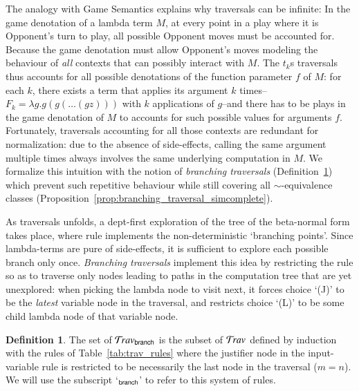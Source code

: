 \documentclass{elsarticle}
\theoremstyle{plain}
\theoremstyle{definition}
\newtheorem{definition}{Definition}[section]
\theoremstyle{remark}
\newcommand\Nodes{\mathcal{N}}%
\newcommand\NodesVar{\Nodes_{\sf var}}%
\newcommand{\branching}{{\sf branch}}
\newcommand{\travsetbr}{{\travset_\branching}}
\newcommand{\travulc}{\travset}
\newcommand{\rulefont}[1]{\mathbf{\sf #1}}
\newcommand{\enables}{\vdash} %
\newcommand{\ExtNodes}{\Nodes^{\sf ext}}
\begin{document}
The analogy with Game Semantics explains why traversals can be infinite: In the game denotation of a lambda term $M$, at every point in a play where it is Opponent's turn to play, all possible Opponent moves must be accounted for. Because the game denotation must allow Opponent's moves modeling the behaviour of \emph{all} contexts that can possibly interact with $M$. The $t_k$s traversals thus accounts for all possible denotations of the function parameter $f$ of $M$: for each $k$, there exists a term that applies its argument $k$ times--$F_k = \lambda g . g (g ( \ldots (g z)))$ with $k$ applications of $g$--and there has to be plays in the game denotation of $M$ to accounts for such possible values for arguments $f$. Fortunately, traversals accounting for all those contexts are redundant for normalization: due to the absence of side-effects, calling the same argument multiple times always involves the same underlying computation in $M$. We formalize this intuition with the notion of \emph{branching traversals} (Definition~\ref{dfn:branching_traversals})  which prevent such repetitive behaviour while still covering all $\sim$-equivalence classes (Proposition~\ref{prop:branching_traversal_simcomplete}).

As traversals unfolds, a dept-first exploration of the tree of the beta-normal form takes place, where rule  implements the non-deterministic `branching points'. Since lambda-terms are pure of side-effects,
it is sufficient to explore each possible branch only once.
\emph{Branching traversals} implement this idea by restricting the rule  so as to traverse only nodes leading to paths in the computation tree that are yet unexplored: when picking the lambda node to visit next, it forces choice `(J)' to be the \emph{latest} variable node in the traversal, and restricts choice `(L)' to be some child lambda node of that variable node.

\begin{definition}
\label{dfn:branching_traversals}
The set of  $\travsetbr$ is the subset of $\travulc$ defined by induction with the rules of Table~\ref{tab:trav_rules} where the justifier node in the
input-variable rule  is restricted to be necessarily the last node in the traversal ($m=n$).
We will use the subscript `${}_\branching$' to refer to this system of rules.
\end{definition}
\end{document}
